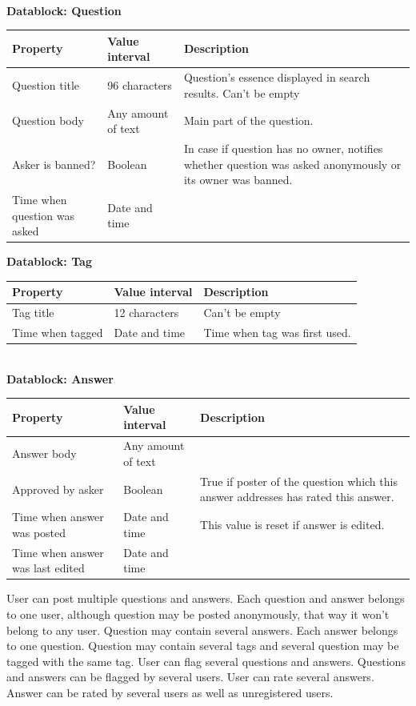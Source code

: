 \documentclass[a4paper,12pt]{article}
\begin{document}
\hspace*{\fill}\\
\textbf{Datablock: Question}
\begin{center}
    \begin{tabular}{ | p{4cm} | p{3cm} | p{5cm} |}
    \hline
    Property & Value interval & Description \\ \hline
    Question title & 96 characters & Question's essence displayed in search results. Can't be empty \\ \hline
    Question body & Any amount of text & Main part of the question. \\ \hline
    Asker is banned? & Boolean & In case if question has no owner, notifies whether question was asked anonymously or its owner was banned. \\ \hline
    Time when question was asked & Date and time &  \\
    \hline
    \end{tabular}
\end{center}
\newpage
\textbf{Datablock: Tag}
\begin{center}
    \begin{tabular}{ | p{4cm} | p{3cm} | p{5cm} |}
    \hline
    Property & Value interval & Description \\ \hline
    Tag title & 12 characters & Can't be empty \\ \hline
    Time when tagged & Date and time & Time when tag was first used. \\ \hline
    \end{tabular}
\end{center}
\hspace*{\fill}\\
\textbf{Datablock: Answer}
\begin{center}
    \begin{tabular}{ | p{4cm} | p{3cm} | p{5cm} |}
    \hline
    Property & Value interval & Description \\ \hline
    Answer body & Any amount of text &  \\ \hline
    Approved by asker & Boolean & True if poster of the question which this answer addresses has rated this answer. \\
    \hline
    Time when answer was posted & Date and time & This value is reset if answer is edited. \\
    \hline
    Time when answer was last edited & Date and time & \\
    \hline
    \end{tabular}
\end{center}
User can post multiple questions and answers. Each question and answer belongs to one user, although question may be posted anonymously, that way it won't belong to any user. Question may contain several answers. Each answer belongs to one question. Question may contain several tags and several question may be tagged with the same tag. User can flag several questions and answers. Questions and answers can be flagged by several users. User can rate several answers. Answer can be rated by several users as well as unregistered users.
\newpage
\end{document}
